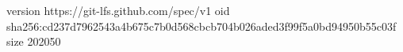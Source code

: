 version https://git-lfs.github.com/spec/v1
oid sha256:cd237d7962543a4b675c7b0d568cbcb704b026aded3f99f5a0bd94950b55c03f
size 202050
